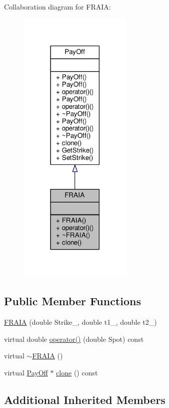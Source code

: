 Collaboration diagram for F\+R\+A\+IA\+:
\nopagebreak
\begin{figure}[H]
\begin{center}
\leavevmode
\includegraphics[width=153pt]{classFRAIA__coll__graph}
\end{center}
\end{figure}
\subsection*{Public Member Functions}
\begin{DoxyCompactItemize}
\item 
\hyperlink{classFRAIA_a92f6b039cd46b89c069a50081cb463d9}{F\+R\+A\+IA} (double Strike\+\_\+, double t1\+\_\+, double t2\+\_\+)
\item 
virtual double \hyperlink{classFRAIA_a4b1c0992470500cfab0ce3bbecbc9176}{operator()} (double Spot) const
\item 
virtual \hyperlink{classFRAIA_ad9c278d2c3d92254f2c0341a3895fbe4}{$\sim$\+F\+R\+A\+IA} ()
\item 
virtual \hyperlink{classPayOff}{Pay\+Off} $\ast$ \hyperlink{classFRAIA_aa11775b4c17e62bed9c6f4114b2a49a7}{clone} () const
\end{DoxyCompactItemize}
\subsection*{Additional Inherited Members}


